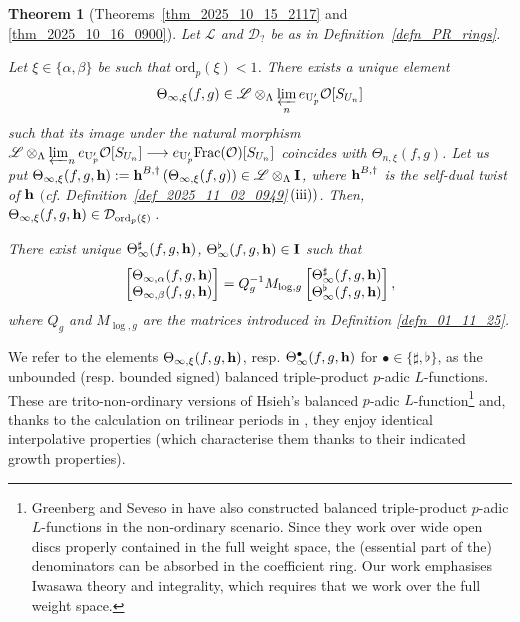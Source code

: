 \documentclass{amsart}
\numberwithin{equation}{section}
\newtheorem{lthm}{Theorem}
\newcommand{\ord}{\mathrm{ord}}
\newcommand{\cO}{\mathcal{O}}
\newcommand{\LL}{\Lambda}
\newcommand{\h}{\textup{\bf h}}
\newcommand{\lra}{\longrightarrow}
\newcommand{\sL}{\mathscr{L}}
\begin{document}
\begin{lthm}[Theorems~\ref{thm_2025_10_15_2117} and \ref{thm_2025_10_16_0900}]\label{thmE}
Let $\sL$ and $\mathcal{D}_{?}$ be as in Definition~\ref{defn_PR_rings}.
\item[i)] Let $\xi\in\{\alpha,\beta\}$ be such that $\ord_p(\xi)<1$.  There exists a unique element 
$$\Theta_{\infty,\xi}(f,g)\in \mathscr{L} \otimes_\LL\varprojlim_n e_{\mathrm{U}_{p}'}\cO[S_{U_n}]$$ such that its image under the natural morphism 
$ \mathscr{L} \otimes_{\LL}\varprojlim_n e_{\mathrm{U}_{p}'}\cO[S_{U_n}] \lra e_{\mathrm{U}_{p}'}{\rm Frac}(\mathcal{O})[S_{U_n}]$ coincides with $\Theta_{n,\xi}(f,g)$. Let us put $\Theta_{\infty,\xi}(f,g,\h):=\h^{B, \dagger}\left(\Theta_{\infty,\xi}(f,g)\right)\in \mathscr{L} \otimes_\LL \mathbf{I}$, where $\h^{B, \dagger}$ is the self-dual twist of $\h$ $($cf. Definition~\ref{def_2025_11_02_0949}\,$(\textup{iii}))$. Then, $\Theta_{\infty,\xi}(f,g,\h) \in \mathcal{D}_{\ord_p(\xi)}$\,.
\item[ii)] There exist unique $\Theta_{\infty}^\sharp(f,g,\h)$, $\Theta_{\infty}^\flat(f,g,\h) \in \mathbf{I}$ such that
    \[
    \begin{bmatrix}
      \Theta_{\infty,\alpha}(f,g,\h)\\  
      \Theta_{\infty,\beta}(f,g,\h)\end{bmatrix}=Q_g^{-1}M_{\log,g}
\begin{bmatrix}
      \Theta_{\infty}^\sharp(f,g,\h)\\  
      \Theta_{\infty}^\flat(f,g,\h)
\end{bmatrix}    ,
    \]
    where $Q_g$ and $M_{\log,g}$ are the matrices introduced in Definition \ref{defn_01_11_25}.
\end{lthm}

\noindent We refer to the elements $\Theta_{\infty,\xi}(f,g,\h)$, resp.  $\Theta_{\infty}^\bullet(f,g,\h)$ for $\bullet \in \{\sharp, \flat \}$, as the unbounded (resp. bounded signed) balanced triple-product $p$-adic $L$-functions. These are trito-non-ordinary versions of Hsieh's balanced $p$-adic $L$-function\footnote{Greenberg and Seveso in \cite{GreenbergSeveso} have also constructed balanced triple-product $p$-adic $L$-functions in the non-ordinary scenario. Since they work over wide open discs properly contained in the full weight space, the (essential part of the) denominators can be absorbed in the coefficient ring. Our work emphasises Iwasawa theory and integrality, which requires that we work over the full weight space. } and, thanks to the calculation on trilinear periods in \cite[\S4]{hsiehpadicbalanced}, they enjoy identical interpolative properties (which characterise them thanks to their indicated growth properties). 
\end{document}
